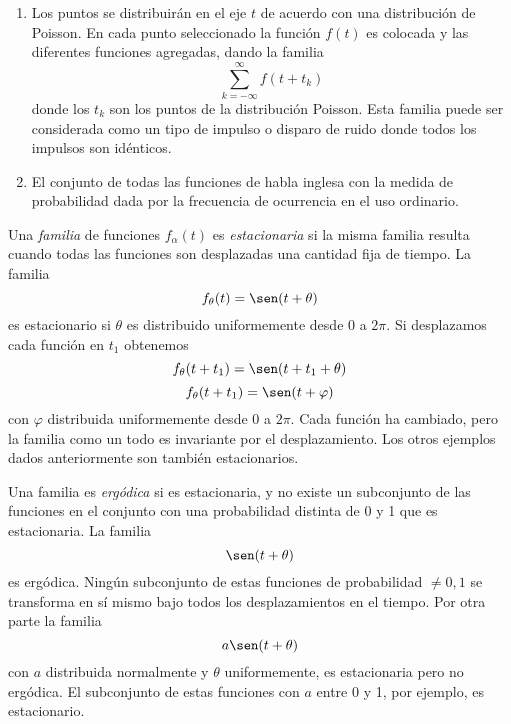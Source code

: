 \begin{enumerate}
  \item Los puntos se distribuir\'an en el eje $t$ de acuerdo con una
  distribuci\'on de Poisson. En cada punto seleccionado la funci\'on
  $f(t)$ es colocada y las diferentes funciones agregadas, dando la
  familia
  \begin{equation}
    \sum_{k=-\infty}^{\infty} f(t+t_k)
  \end{equation}
  donde los $t_k$ son los puntos de la distribuci\'on Poisson. Esta
  familia puede ser considerada como un tipo de impulso o disparo de
  ruido donde todos los impulsos son id\'enticos.

  \item El conjunto de todas las funciones de habla inglesa con la medida de
  probabilidad dada por la frecuencia de ocurrencia en el uso ordinario.
\end{enumerate}

Una {\em familia} de funciones $f_{\alpha}(t)$ es {\em estacionaria}
si la misma familia resulta cuando todas las funciones son desplazadas
una cantidad fija de tiempo. La familia
\begin{equation}
  f_{\theta}(t) = \sen(t+\theta)
\end{equation}
es estacionario si $\theta$ es distribuido uniformemente desde 0 a $2\pi$. Si
desplazamos cada funci\'on en $t_1$ obtenemos
\begin{equation}
  f_{\theta}(t+t_1) = \sen(t+t_1+\theta)
\end{equation}
\begin{equation}
  f_{\theta}(t+t_1) = \sen(t+\varphi)
\end{equation}
con $\varphi$ distribuida uniformemente desde 0 a $2\pi$. Cada funci\'on ha
cambiado, pero la familia como un todo es invariante por el desplazamiento.
Los otros ejemplos dados anteriormente son tambi\'en estacionarios.

Una familia es {\em erg\'odica} si es estacionaria, y no existe un subconjunto
de las funciones en el conjunto con una probabilidad distinta de 0 y 1 que es
estacionaria. La familia
\begin{equation}
  \sen(t+\theta)
\end{equation}
es erg\'odica. Ning\'un subconjunto de estas funciones de probabilidad
$\neq0,1$ se transforma en s\'i mismo bajo todos los desplazamientos en el
tiempo. Por otra parte la familia
\begin{equation}
  a \sen(t+\theta)
\end{equation}
con $a$ distribuida normalmente y $\theta$ uniformemente, es estacionaria pero
no erg\'odica. El subconjunto de estas funciones con $a$ entre 0 y 1, por
ejemplo, es estacionario.

